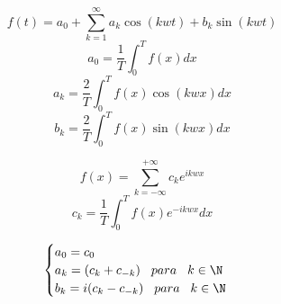 \begin{equation}
    \label{eq:Fourierserie}
    f(t) = a_0 + \sum_{k=1}^\infty a_k\cos{(kwt)} + b_k\sin{(kwt)}
\end{equation}
\begin{equation}
    \label{eq:a0Fourier}
    a_0 = \frac{1}{T}\int_0^T f(x)dx
\end{equation}
\begin{equation}
    \label{eq:akFourier}
    a_k = \frac{2}{T}\int_0^T f(x)\cos{(kwx)}dx
\end{equation}
\begin{equation}
    \label{eq:bkFourier}
    b_k = \frac{2}{T}\int_0^T f(x)\sin{(kwx)}dx
\end{equation}

\begin{equation}
    \label{eq:Fouriercomplexa}
    f(x) = \sum^{+\infty}_{k=-\infty} c_k e^{ikwx}
\end{equation}
\begin{equation}
    \label{eq:ckFouerier}
    c_k = \frac{1}{T} \int^T_0 f(x)e^{-ikwx}dx
\end{equation}

\begin{equation*}
    \begin{cases}
    a_0 = c_0\\
    a_k = (c_k + c_{-k})\hspace{0.3cm}para\hspace{0.3cm}k\in\N\\
    b_k = i(c_k - c_{-k})\hspace{0.3cm}para\hspace{0.3cm}k\in\N
    \end{cases}
\end{equation*}